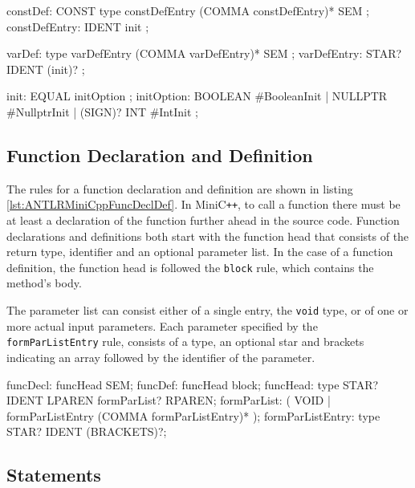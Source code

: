 \begin{AntlrCode}[float,numbers=none,caption=Variable and constant defintions of the MiniC++ ANTLR grammar., label=lst:ANTLRMiniCppVarConstDef]
constDef:        CONST type constDefEntry (COMMA constDefEntry)* SEM ;
constDefEntry:   IDENT init ;

varDef:          type varDefEntry (COMMA varDefEntry)* SEM ;
varDefEntry:     STAR? IDENT (init)? ;

init:            EQUAL  initOption ;
initOption:      BOOLEAN      #BooleanInit
               | NULLPTR      #NullptrInit
               | (SIGN)? INT  #IntInit
               ;
\end{AntlrCode}

\subsection{Function Declaration and Definition}

The rules for a function declaration and definition are shown in listing \ref{lst:ANTLRMiniCppFuncDeclDef}. In MiniC\verb|++|, to call a function there must be at least a declaration of the function further ahead in the source code. Function declarations and definitions both start with the function head that consists of the return type, identifier and an optional parameter list. In the case of a function definition, the function head is followed the \texttt{block} rule, which contains the method's body. 

The parameter list can consist either of a single entry, the \texttt{void} type, or of one or more actual input parameters. Each parameter specified by the \texttt{formParListEntry} rule, consists of a type, an optional star and brackets indicating an array followed by the identifier of the parameter.


\begin{AntlrCode}[float,numbers=none,caption=Function declaration and defintion of the MiniC++ ANTLR grammar., label=lst:ANTLRMiniCppFuncDeclDef]
funcDecl:         funcHead SEM;
funcDef:          funcHead block;
funcHead:         type STAR? IDENT LPAREN formParList? RPAREN;
formParList:      (     VOID
                  |     formParListEntry (COMMA formParListEntry)*
                  );
formParListEntry: type STAR? IDENT (BRACKETS)?;
\end{AntlrCode}

\subsection{Statements}

